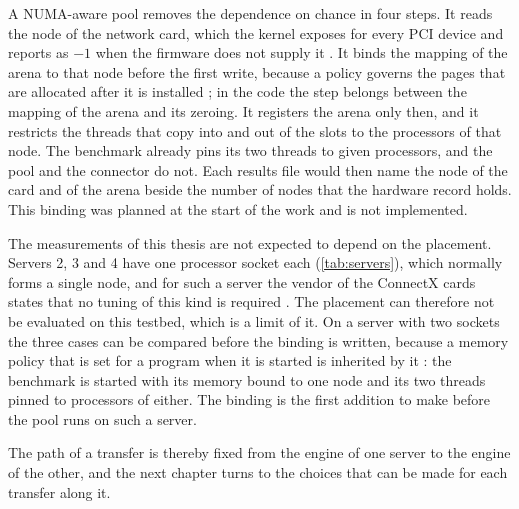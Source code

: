 A NUMA-aware pool removes the dependence on chance in four steps. It reads
the node of the network card, which the kernel exposes for every PCI device
and reports as $-1$ when the firmware does not supply it
\citep{kernel_sysfs_pci}. It binds the mapping of the arena to that node
before the first write, because a policy governs the pages that are
allocated after it is installed \citep{kernel_mempolicy}; in the code the
step belongs between the mapping of the arena and its zeroing. It registers
the arena only then, and it restricts the threads that copy into and out of
the slots to the processors of that node. The benchmark already pins its two
threads to given processors, and the pool and the connector do not. Each
results file would then name the node of the card and of the arena beside
the number of nodes that the hardware record holds. This binding was planned
at the start of the work and is not implemented.

The measurements of this thesis are not expected to depend on the placement.
Servers 2, 3 and 4 have one processor socket each (\cref{tab:servers}), which
normally forms a single node, and for such a server the vendor of the
ConnectX cards states that no tuning of this kind is required
\citep{nvidia_cx4_tuning}. The placement can therefore not be evaluated on
this testbed, which is a limit of it. On a server with two sockets the three
cases can be compared before the binding is written, because a memory policy
that is set for a program when it is started is inherited by it
\citep{kernel_mempolicy}: the benchmark is started with its memory bound to
one node and its two threads pinned to processors of either. The binding is
the first addition to make before the pool runs on such a server.

The path of a transfer is thereby fixed from the engine of one server to the
engine of the other, and the next chapter turns to the choices that can be
made for each transfer along it.
